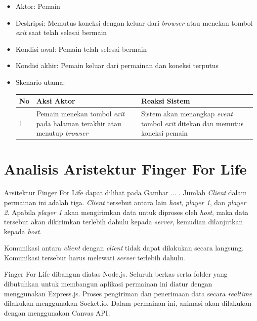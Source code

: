 \begin{enumerate}
\begin{itemize}
			\item Aktor: Pemain
			
			\item Deskripsi: Memutus koneksi dengan keluar dari \textit{browser} atau menekan tombol \textit{exit} saat telah selesai bermain
			
			\item Kondisi awal: Pemain telah selesai bermain
			
			\item Kondisi akhir: Pemain keluar dari permainan dan koneksi terputus
			
			\item Skenario utama:
			
			\begin{tabular}{ |p{1cm}|p{4cm}|p{4cm}|}
				\hline
				No & Aksi Aktor & Reaksi Sistem \\ \hline
				1 & Pemain menekan tombol \textit{exit} pada halaman terakhir atau menutup \textit{browser} & Sistem akan menangkap \textit{event} tombol \textit{exit} ditekan dan memutus koneksi pemain \\ \hline
			\end{tabular}
		\end{itemize}
\end{enumerate}


\section{Analisis Aristektur Finger For Life}
Arsitektur Finger For Life dapat dilihat pada Gambar ... . Jumlah \textit{Client} dalam permainan ini adalah tiga. \textit{Client} tersebut antara lain \textit{host}, \textit{player 1}, dan \textit{player 2}. Apabila \textit{player 1} akan mengirimkan data untuk diproses oleh \textit{host}, maka data tersebut akan dikirimkan terlebih dahulu kepada \textit{server}, kemudian dilanjutkan kepada \textit{host}.

Komunikasi antara \textit{client} dengan \textit{client} tidak dapat dilakukan secara langsung. Komunikasi tersebut harus melewati \textit{server} terlebih dahulu. 

Finger For Life dibangun diatas Node.js. Seluruh berkas serta folder yang dibutuhkan untuk membangun aplikasi permainan ini diatur dengan menggunakan Express.js. Proses pengiriman dan penerimaan data secara \textit{realtime} dilakukan menggunakan Socket.io. Dalam permainan ini, animasi akan dilakukan dengan menggunakan Canvas API.
